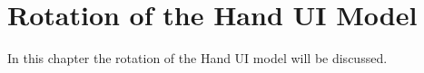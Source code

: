 \chapter{Rotation of the Hand UI Model}

\label{Chapter4_rotation} 

In this chapter the rotation of the Hand UI model will be discussed. 

